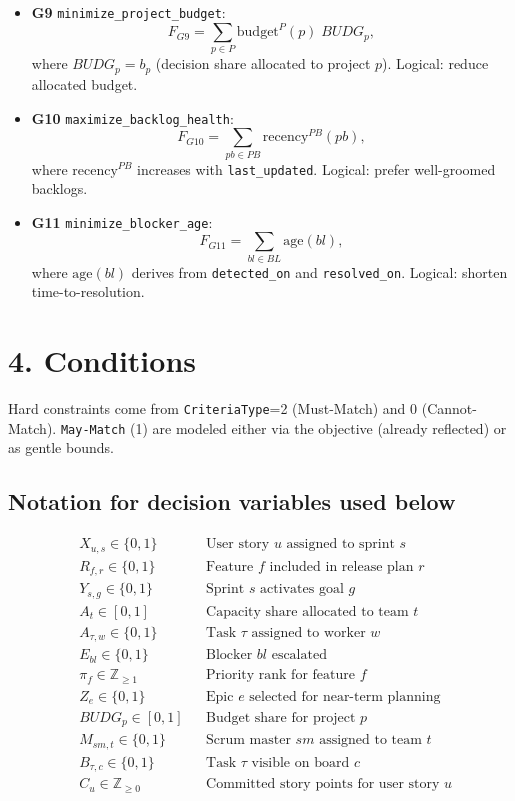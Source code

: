 \documentclass[11pt,a4paper]{article}
\begin{document}
\begin{itemize}[leftmargin=2em]
  \item \textbf{G9} \texttt{minimize\_project\_budget}:
  \[
  F_{G9}=\sum_{p\in P}\mathrm{budget}^{P}(p)\;BUDG_p,
  \]
  where $BUDG_p=b_p$ (decision share allocated to project $p$).
  Logical: reduce allocated budget.

  \item \textbf{G10} \texttt{maximize\_backlog\_health}:
  \[
  F_{G10}=\sum_{pb\in PB}\mathrm{recency}^{PB}(pb),
  \]
  where $\mathrm{recency}^{PB}$ increases with \texttt{last\_updated}.
  Logical: prefer well-groomed backlogs.

  \item \textbf{G11} \texttt{minimize\_blocker\_age}:
  \[
  F_{G11}=\sum_{bl\in BL}\mathrm{age}(bl),
  \]
  where $\mathrm{age}(bl)$ derives from \texttt{detected\_on} and \texttt{resolved\_on}.
  Logical: shorten time-to-resolution.
\end{itemize}

\section{4. Conditions}
Hard constraints come from \texttt{CriteriaType}=2 (Must-Match) and 0 (Cannot-Match). \texttt{May-Match} (1) are modeled either via the objective (already reflected) or as gentle bounds.

\subsection*{Notation for decision variables used below}
\[
\begin{aligned}
  &X_{u,s}\in\{0,1\} && \text{User story $u$ assigned to sprint $s$} \\
  &R_{f,r}\in\{0,1\} && \text{Feature $f$ included in release plan $r$} \\
  &Y_{s,g}\in\{0,1\} && \text{Sprint $s$ activates goal $g$} \\
  &A_t\in[0,1] && \text{Capacity share allocated to team $t$} \\
  &A_{\tau,w}\in\{0,1\} && \text{Task $\tau$ assigned to worker $w$} \\
  &E_{bl}\in\{0,1\} && \text{Blocker $bl$ escalated} \\
  &\pi_f\in\mathbb{Z}_{\ge 1} && \text{Priority rank for feature $f$} \\
  &Z_e\in\{0,1\} && \text{Epic $e$ selected for near-term planning} \\
  &BUDG_p\in[0,1] && \text{Budget share for project $p$} \\
  &M_{sm,t}\in\{0,1\} && \text{Scrum master $sm$ assigned to team $t$} \\
  &B_{\tau,c}\in\{0,1\} && \text{Task $\tau$ visible on board $c$} \\
  &C_u\in\mathbb{Z}_{\ge 0} && \text{Committed story points for user story $u$}
\end{aligned}
\]
\end{document}
